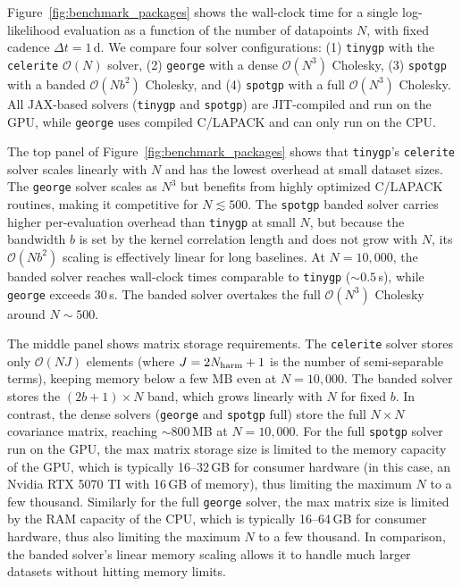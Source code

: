 \documentclass[preprint]{aastex702}
\newcommand{\code}[1]{{\texttt{#1}}}
\begin{document}
Figure~\ref{fig:benchmark_packages} shows the wall-clock time for a single log-likelihood evaluation as a function of the number of datapoints $N$, with fixed cadence $\Delta t = 1$\,d. We compare four solver configurations:
(1) \code{tinygp} with the \code{celerite} $\mathcal{O}(N)$ solver,
(2) \code{george} with a dense $\mathcal{O}(N^3)$ Cholesky,
(3) \code{spotgp} with a banded $\mathcal{O}(Nb^2)$ Cholesky, and
(4) \code{spotgp} with a full $\mathcal{O}(N^3)$ Cholesky.
All JAX-based solvers (\code{tinygp} and \code{spotgp}) are JIT-compiled and run on the GPU, while \code{george} uses compiled C/LAPACK and can only run on the CPU. 

The top panel of Figure~\ref{fig:benchmark_packages} shows that \code{tinygp}'s \code{celerite} solver scales linearly with $N$ and has the lowest overhead at small dataset sizes. The \code{george} solver scales as $N^3$ but benefits from highly optimized C/LAPACK routines, making it competitive for $N \lesssim 500$. The \code{spotgp} banded solver carries higher per-evaluation overhead than \code{tinygp} at small $N$, but because the bandwidth $b$ is set by the kernel correlation length and does not grow with $N$, its $\mathcal{O}(Nb^2)$ scaling is effectively linear for long baselines. At $N = 10{,}000$, the banded solver reaches wall-clock times comparable to \code{tinygp} (${\sim}0.5$\,s), while \code{george} exceeds 30\,s. The banded solver overtakes the full $\mathcal{O}(N^3)$ Cholesky around $N \sim 500$.

The middle panel shows matrix storage requirements. The \code{celerite} solver stores only $\mathcal{O}(NJ)$ elements (where $J = 2N_{\rm harm} + 1$ is the number of semi-separable terms), keeping memory below a few MB even at $N = 10{,}000$. The banded solver stores the $(2b+1) \times N$ band, which grows linearly with $N$ for fixed $b$. In contrast, the dense solvers (\code{george} and \code{spotgp} full) store the full $N \times N$ covariance matrix, reaching ${\sim}800$\,MB at $N = 10{,}000$. For the full \code{spotgp} solver run on the GPU, the max matrix storage size is limited to the memory capacity of the GPU, which is typically 16--32\,GB for consumer hardware (in this case, an Nvidia RTX 5070 TI with 16\,GB of memory), thus limiting the maximum $N$ to a few thousand. Similarly for the full \code{george} solver, the max matrix size is limited by the RAM capacity of the CPU, which is typically 16--64\,GB for consumer hardware, thus also limiting the maximum $N$ to a few thousand. In comparison, the banded solver's linear memory scaling allows it to handle much larger datasets without hitting memory limits.
\end{document}
